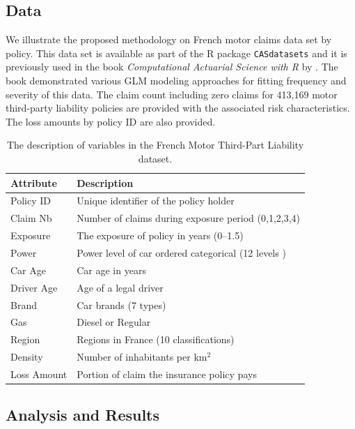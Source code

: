 \documentclass[11pt,letterpaper]{article}
\numberwithin{equation}{section}
\numberwithin{equation}{section}
\numberwithin{equation}{section}
\begin{document}
\subsection{Data}
We illustrate the proposed methodology on French motor claims data set by policy. This data set is available as part of the R package {\tt CASdatasets} and it is previously used in the book {\it Computational Actuarial Science with R}  by \cite{Charpentier:2014}.
The book demonstrated various GLM modeling approaches for fitting frequency and severity of this data. The claim count including zero claims for 413,169 motor third-party liability policies are provided with the associated risk characteristics. The loss amounts by policy ID are also provided. 
\begin{small}
\begin{table}[!htb]
\begin{center}
    \caption{The description of variables in the French Motor Third-Part Liability dataset.} 
      \centering
        \begin{tabular}{ll}
\hline
Attribute & Description \\
\hline
Policy ID & Unique identifier of the policy holder\\
Claim Nb & Number of claims during exposure period  (0,1,2,3,4)\\
Exposure & The exposure of policy in years (0--1.5) \\
Power & Power level of car ordered categorical (12 levels )\\
Car Age & Car age in years \\
Driver Age & Age of a legal driver \\
Brand & Car brands (7 types) \\
Gas & Diesel or Regular \\
Region & Regions in France (10 classifications)\\
Density & Number of inhabitants per km$^2$ \\
Loss Amount & Portion of claim the insurance policy pays\\
\hline
		\end{tabular}
\end{center}
\end{table}
\end{small}

\subsection{Analysis and Results}
\end{document}
